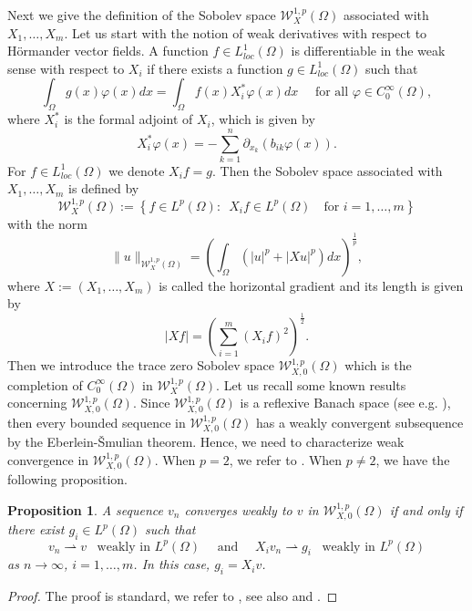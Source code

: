 \documentclass[a4paper,12pt,reqno]{amsart}
\numberwithin{equation}{section}
\theoremstyle{plain}
\newtheorem{proposition}[theorem]{Proposition}
\theoremstyle{definition}
\begin{document}
Next we  give the definition of the Sobolev space $\mathcal{W}_{X}^{1, p}(\Omega)$ associated with  $X_{1}, \ldots, X_{m}$. Let us start with the notion of weak derivatives with respect to H\"ormander vector fields. A function $f\in L^{1}_{loc}(\Omega)$ is differentiable in the weak sense with respect to $X_{i}$ if there exists a function $g\in L^{1}_{loc}(\Omega)$ such that
\begin{equation*}
\int_{\Omega} g(x)  \varphi(x) d x=\int_{\Omega} f(x) X_{i}^{*} \varphi(x) d x\quad \text{ for all } \varphi \in C_{0}^{\infty}(\Omega),
\end{equation*}
where $X_{i}^{*}$ is the formal adjoint of $X_{i}$, which is given by
$$
X_{i}^{*}\varphi(x)=-\sum_{k=1}^n \partial_{x_{k}}\left(b_{ik} \varphi(x)\right).
$$
For $f\in L^{1}_{loc}(\Omega)$ we denote $X_{i}f=g$. Then the Sobolev space associated with $X_{1}, \ldots, X_{m}$ is defined by
\begin{equation*}
\mathcal{W}_{X}^{1, p}(\Omega):=\left\{f \in L^{p}(\Omega):\enspace X_{i} f \in L^{p}(\Omega)\quad \text{for } i=1, \ldots, m \right\}
\end{equation*}
with the norm
\begin{equation}\label{natural norm}
\|u\|_{\mathcal{W}_{X}^{1, p}(\Omega)}=\left(\int_{\Omega}\left(|u|^p+|X u|^p\right) d x\right)^{\frac{1}{p}},
\end{equation}
where $X:=\left(X_{1}, \ldots, X_{m}\right)$ is called the horizontal gradient and its length is given by
$$|X f|=\left(\sum_{i=1}^{m}\left(X_{i} f\right)^{2}\right)^{\frac{1}{2}}.$$
Then we introduce the trace zero Sobolev space $\mathcal{W}_{X,0}^{1, p}(\Omega)$ which is the completion of $C_{0}^{\infty}(\Omega)$ in $\mathcal{W}_{X}^{1, p}(\Omega)$. 
Let us recall some known results concerning $\mathcal{W}_{X,0}^{1, p}(\Omega)$. Since $\mathcal{W}_{X,0}^{1, p}(\Omega)$ is a  reflexive Banach space (see e.g. \cite[Theorem 1]{xu1990subelliptic}), then every bounded sequence in $\mathcal{W}_{X,0}^{1, p}(\Omega)$ has a weakly convergent subsequence by the Eberlein-\v{S}mulian theorem. Hence, we need to characterize weak convergence in $\mathcal{W}_{X,0}^{1, p}(\Omega)$.  When $p=2$, we refer to \cite[Proposition 2.6]{bramanti2023hormander}. When $p\neq 2$, we have the following proposition.
\begin{proposition}\label{Weak convergence characterization}
A sequence $v_n$ converges weakly to $v$ in $\mathcal{W}_{X,0}^{1, p}(\Omega)$ if and only if there exist $g_{i}\in L^{p}(\Omega)$ such that 
$$v_n\rightharpoonup v \enspace\text{ weakly in } L^{p}(\Omega) \quad \text{ and } \quad X_{i}v_n\rightharpoonup g_{i}\enspace \text{ weakly in } L^{p}(\Omega)$$ 
as $n\to\infty$, $i=1,\ldots,m$. In this case, $g_{i}=X_{i}v$.
\end{proposition}
\begin{proof}
The proof is standard, we refer to \cite[Proposition 1.8]{LeDret2018}, see also \cite[Corollary 11.70]{Leoni2017Sobolev} and \cite[Proposition 2.2]{capogna2024asymptotic}.
\end{proof}
\end{document}
